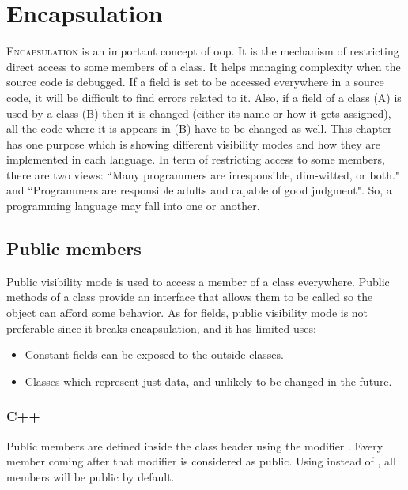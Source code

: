 \documentclass{KodeBook}
\begin{document}
\fi

\chapter{Encapsulation}

\begin{introduction}
	\lettrine{E}{ncapsulation} is an important concept of \ac{oop}. 
	It is the mechanism of restricting direct access to some members of a class.
	It helps managing complexity when the source code is debugged. 
	If a field is set to be accessed everywhere in a source code, it will be difficult to find errors related to it. 
	Also, if a field of a class (A) is used by a class (B) then it is changed (either its name or how it gets assigned), all the code where it is appears in (B) have to be changed as well. 
	This chapter has one purpose which is showing different visibility modes and how they are implemented in each language.
	In term of restricting access to some members, there are two views: ``Many programmers are irresponsible, dim-witted, or both." and ``Programmers are responsible adults and capable of good judgment".
	So, a programming language may fall into one or another.
\end{introduction} 

\section{Public members}

Public visibility mode is used to access a member of a class everywhere. 
Public methods of a class provide an interface that allows them to be called so the object can afford some behavior. 
As for fields, public visibility mode is not preferable since it breaks encapsulation, and it has limited uses:
\begin{itemize}
	\item Constant fields can be exposed to the outside classes.%
	\item Classes which represent just data, and unlikely to be changed in the future.
\end{itemize}

\subsection{C++}

Public members are defined inside the class header using the modifier . 
Every member coming after that modifier is considered as public.
Using  instead of , all members will be public by default.
\end{document}
